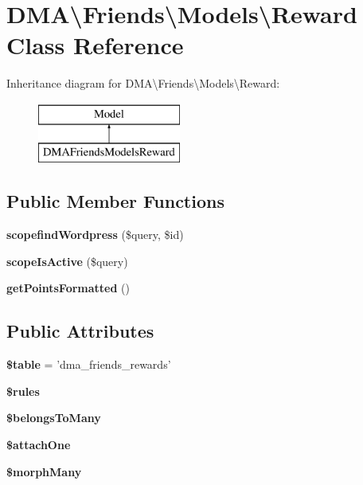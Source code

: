 \hypertarget{classDMA_1_1Friends_1_1Models_1_1Reward}{\section{D\-M\-A\textbackslash{}Friends\textbackslash{}Models\textbackslash{}Reward Class Reference}
\label{classDMA_1_1Friends_1_1Models_1_1Reward}
}
Inheritance diagram for D\-M\-A\textbackslash{}Friends\textbackslash{}Models\textbackslash{}Reward\-:\begin{figure}[H]
\begin{center}
\leavevmode
\includegraphics[height=2.000000cm]{d7/dc4/classDMA_1_1Friends_1_1Models_1_1Reward}
\end{center}
\end{figure}
\subsection*{Public Member Functions}
\begin{DoxyCompactItemize}
\item 
\hypertarget{classDMA_1_1Friends_1_1Models_1_1Reward_a672b475953c8ef5691e9c5a209204cfe}{{\bfseries scopefind\-Wordpress} (\$query, \$id)}\label{classDMA_1_1Friends_1_1Models_1_1Reward_a672b475953c8ef5691e9c5a209204cfe}

\item 
\hypertarget{classDMA_1_1Friends_1_1Models_1_1Reward_a9105978ce5ddcdc266d5023c047a72ce}{{\bfseries scope\-Is\-Active} (\$query)}\label{classDMA_1_1Friends_1_1Models_1_1Reward_a9105978ce5ddcdc266d5023c047a72ce}

\item 
\hypertarget{classDMA_1_1Friends_1_1Models_1_1Reward_ad83959066e99e68d6f527d12027693e0}{{\bfseries get\-Points\-Formatted} ()}\label{classDMA_1_1Friends_1_1Models_1_1Reward_ad83959066e99e68d6f527d12027693e0}

\end{DoxyCompactItemize}
\subsection*{Public Attributes}
\begin{DoxyCompactItemize}
\item 
\hypertarget{classDMA_1_1Friends_1_1Models_1_1Reward_a99affaf28976dda4adc97dfe06a6c000}{{\bfseries \$table} = 'dma\-\_\-friends\-\_\-rewards'}\label{classDMA_1_1Friends_1_1Models_1_1Reward_a99affaf28976dda4adc97dfe06a6c000}

\item 
{\bfseries \$rules}
\item 
{\bfseries \$belongs\-To\-Many}
\item 
{\bfseries \$attach\-One}
\item 
{\bfseries \$morph\-Many}
\end{DoxyCompactItemize}
